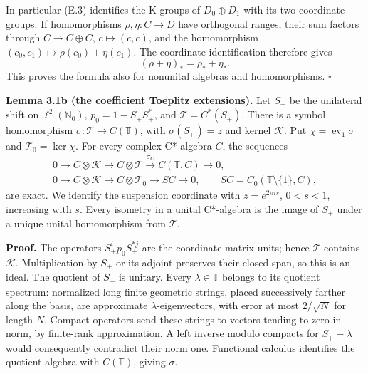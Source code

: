 \documentclass[
  11pt,
]{article}
\begin{document}
In particular (E.3) identifies the K-groups of \(D_0\oplus D_1\) with
its two coordinate groups. If homomorphisms \(\rho,\eta:C\to D\) have
orthogonal ranges, their sum factors through \(C\to C\oplus C\),
\(c\mapsto(c,c)\), and the homomorphism
\((c_0,c_1)\mapsto\rho(c_0)+\eta(c_1)\). The coordinate identification
therefore gives \[
(\rho+\eta)_*=\rho_*+\eta_*.
\tag{E.5}
\] This proves the formula also for nonunital algebras and
homomorphisms. \(\square\)

\textbf{Lemma 3.1b (the coefficient Toeplitz extensions).} Let \(S_+\)
be the unilateral shift on \(\ell^2(\mathbb N_0)\), \(p_0=1-S_+S_+^*\),
and \(\mathcal T=C^*(S_+)\). There is a symbol homomorphism
\(\sigma:\mathcal T\to C(\mathbb T)\), with \(\sigma(S_+)=z\) and kernel
\(\mathcal K\). Put \(\chi=\operatorname{ev}_1\sigma\) and
\(\mathcal T_0=\ker\chi\). For every complex C*-algebra \(C\), the
sequences \[
\begin{gathered}
0\longrightarrow C\otimes\mathcal K\longrightarrow C\otimes\mathcal T
\xrightarrow{\sigma_C}C(\mathbb T,C)\longrightarrow0,\\
0\longrightarrow C\otimes\mathcal K\longrightarrow C\otimes\mathcal T_0
\longrightarrow SC\longrightarrow0,\qquad
SC=C_0(\mathbb T\setminus\{1\},C),
\end{gathered}
\tag{E.6}
\] are exact. We identify the suspension coordinate with
\(z=e^{2\pi i s}\), \(0<s<1\), increasing with \(s\). Every isometry in
a unital C*-algebra is the image of \(S_+\) under a unique unital
homomorphism from \(\mathcal T\).

\textbf{Proof.} The operators \(S_+^i p_0 S_+^{*j}\) are the coordinate
matrix units; hence \(\mathcal T\) contains \(\mathcal K\).
Multiplication by \(S_+\) or its adjoint preserves their closed span, so
this is an ideal. The quotient of \(S_+\) is unitary. Every
\(\lambda\in\mathbb T\) belongs to its quotient spectrum: normalized
long finite geometric strings, placed successively farther along the
basis, are approximate \(\lambda\)-eigenvectors, with error at most
\(2/\sqrt N\) for length \(N\). Compact operators send these strings to
vectors tending to zero in norm, by finite-rank approximation. A left
inverse modulo compacts for \(S_+-\lambda\) would consequently
contradict their norm one. Functional calculus identifies the quotient
algebra with \(C(\mathbb T)\), giving \(\sigma\).
\end{document}
